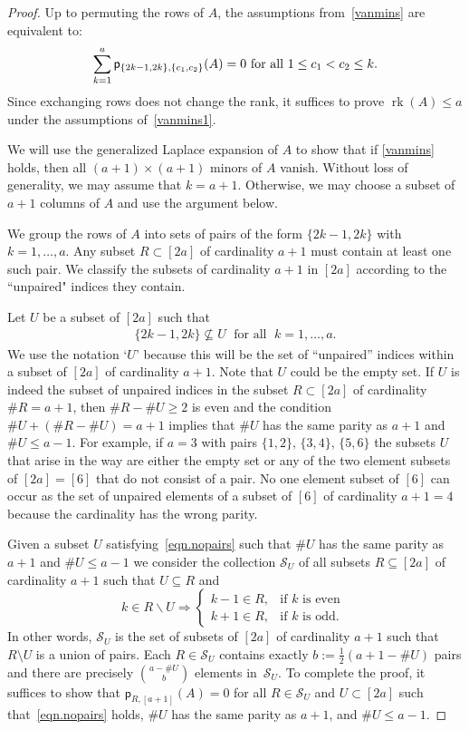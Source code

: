 \documentclass[11pt]{amsart}
\theoremstyle{remark}
\theoremstyle{remark}
\theoremstyle{definition}
\theoremstyle{definition}
\theoremstyle{definition}
\numberwithin{equation}{section}
\newcommand{\rk}{\operatorname{rk}}
\newcommand{\cs}{\mathcal{S}}
\newcommand{\pl}{\mathsf{p}}
\begin{document}
\begin{proof}
Up to permuting the rows of $A$, the assumptions from~\eqref{vanmins} are equivalent to: 
\begin{equation}\label{vanmins1}
\sum_{k=1}^a \pl_{\{2k-1,2k\},\{c_1,c_2\}}(A)=0 \textup{ for all } 1\leq c_1<c_2\leq k.
\end{equation}
Since exchanging rows does not change the rank, it suffices to prove $\rk (A) \leq a$ under the assumptions of~\eqref{vanmins1}.

We will use the generalized Laplace expansion of $A$ to show that if \eqref{vanmins} holds, then all $(a+1)\times(a+1)$ minors of $A$ vanish. 
Without loss of generality, we may assume that $k=a+1$. Otherwise, we may choose a subset of $a+1$ columns of $A$ and use the argument below.

We group the rows of $A$ into sets of pairs of the form $\{2k-1, 2k\}$ with $k=1, \ldots, a$. Any subset $R\subset[2a]$ of cardinality $a+1$ must contain at least one such pair. We classify the subsets of cardinality $a+1$ in $[2a]$ according to the ``unpaired" indices they contain. 

Let $U$ be a subset of $[2a]$ such that
\begin{align}\label{eqn.nopairs}
\{2k-1,2k\}\nsubseteq U\; \text{ for all } \; k=1, \ldots, a.
\end{align}
We use the notation `$U$' because this will be the set of ``unpaired'' indices within a subset of $[2a]$ of cardinality $a+1$. Note that $U$ could be the empty set. If $U$ is indeed the subset of unpaired indices in the subset $R\subset [2a]$ of cardinality $\#R = a+1$, then $\#R-\#U \geq 2$ is even and the condition $\#U + (\#R-\#U) = a+1$ implies that $\#U$ has the same parity as $a+1$ and $\#U \leq a-1$. For example, if $a=3$ with pairs $\{1, 2\}, \,\{3,4\},\, \{5,6\}$ the subsets $U$ that arise in the way are either the empty set or any of the two element subsets of $[2a]=[6]$ that do not consist of a pair. No one element subset of $[6]$ can occur as the set of unpaired elements of a subset of $[6]$ of cardinality $a+1=4$ because the cardinality has the wrong parity.

Given a subset $U$ satisfying~\eqref{eqn.nopairs} such that $\#U$ has the same parity as $a+1$ and $\#U\leq a-1$ we consider the collection $\cs_U$ of all subsets $R\subseteq [2a]$ of cardinality $a+1$ such that $U\subseteq R$ and
\[
k\in R\backslash U\Rightarrow\begin{cases}
    k-1\in R, & \text{if $k$ is even } \\
    k+1\in R,  & \text{if $k$ is odd. }
\end{cases}
\]
In other words, $\cs_U$ is the set of subsets of $[2a]$ of cardinality $a+1$ such that $R\setminus U$ is a union of pairs. Each $R\in \cs_U$ contains exactly $b:=\frac{1}{2}(a+1-\#U)$ pairs and there are precisely $\binom{a-\#U}{b}$ elements in~$\cs_U$. To complete the proof, it suffices to show that $\pl_{R,[a+1]}(A)=0$ for all $R\in \cs_U$ and $U\subset [2a]$ such that~\eqref{eqn.nopairs} holds, $\#U$ has the same parity as $a+1$, and $\#U\leq a-1$.



\end{proof}
\end{document}
